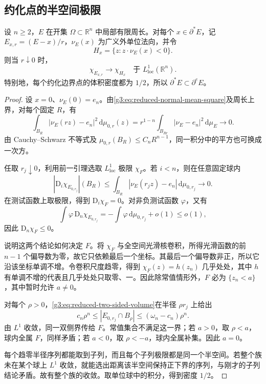 \subsection{约化点的半空间极限}
\label{g3:subsec:2104:03}
\begin{theorem}\label{g3:thm:reduced-boundary-blowup}
	设 \(n\ge2\)，\(E\) 在开集 \(\Omega\subset\mathbb R^n\) 中局部有限周长。对每个 \(x\in\partial^*E\)，记 \(E_{x,r}=(E-x)/r\)，\(\nu_E(x)\) 为广义外单位法向，并令
	\[
		H_x=\{z:z\cdot\nu_E(x)<0\}.
	\]
	则当 \(r\downarrow0\) 时，
	\begin{equation}\label{g3:eq:reduced-halfspace-blowup}
		\chi_{E_{x,r}}\longrightarrow\chi_{H_x}
		\quad\text{于 }L^1_{\mathrm{loc}}(\mathbb R^n).
	\end{equation}
	特别地，每个约化边界点的体积密度都为 \(1/2\)，所以 \(\partial^*E\subset\partial^eE\)。
\end{theorem}
\begin{proof}
	设 \(x=0\)、\(\nu_E(0)=e_n\)。由\eqref{g3:eq:reduced-normal-mean-square}及周长上界，对每个固定 \(R\)，有
	\begin{equation}\label{g3:eq:blowup-normal-error}
		\int_{B_R}|\nu_E(rz)-e_n|^2\,\mathrm d\mu_{0,r}(z)
		=r^{1-n}\int_{B_{Rr}}|\nu_E-e_n|^2\,\mathrm d\mu_E
		\longrightarrow0.
	\end{equation}
	由 Cauchy--Schwarz 不等式及 \(\mu_{0,r}(B_R)\le C_nR^{n-1}\)，同一积分中的平方也可换成一次方。

	任取 \(r_j\downarrow0\)，利用前一引理选取 \(L^1_{\mathrm{loc}}\) 极限 \(\chi_F\)。若 \(i<n\)，则在任意固定球内
	\[
		|\mathrm D_i\chi_{E_{0,r_j}}|(B_R)
		\le\int_{B_R}|\nu_E(r_jz)-e_n|\,\mathrm d\mu_{0,r_j}\longrightarrow0.
	\]
	在测试函数上取极限，得到 \(\mathrm D_i\chi_F=0\)。对非负测试函数 \(\varphi\)，又有
	\[
		\int\varphi\,\mathrm D_n\chi_{E_{0,r_j}}
		=-\int\varphi\,\mathrm d\mu_{0,r_j}+o(1)\le o(1),
	\]
	因此 \(\mathrm D_n\chi_F\le0\)。

	说明这两个结论如何决定 \(F\)。将 \(\chi_F\) 与全空间光滑核卷积，所得光滑函数的前 \(n-1\) 个偏导数为零，故它只依赖最后一个坐标。其最后一个偏导数非正，所以它沿该坐标单调不增。令卷积尺度趋零，得到
	\(\chi_F(z)=h(z_n)\) 几乎处处，其中 \(h\) 有单调不增的代表且几乎处处只取零、一。因此除常值情形外，\(F\) 必为
	\(\{z_n<a\}\)，其中暂时允许 \(a\ne0\)。

	对每个 \(\rho>0\)，\eqref{g3:eq:reduced-two-sided-volume}在半径 \(\rho r_j\) 上给出
	\[
		c_n\rho^n\le |E_{0,r_j}\cap B_\rho|
		\le(\omega_n-c_n)\rho^n.
	\]
	由 \(L^1\) 收敛，同一双侧界传给 \(F\)。常值集合不满足这一界；若 \(a>0\)，取 \(\rho<a\)，球内全属 \(F\)，同样矛盾；若 \(a<0\)，取 \(\rho<-a\)，球内全属补集。因此 \(a=0\)。

	每个趋零半径序列都能取到子列，而且每个子列极限都是同一个半空间。若整个族未在某个球上 \(L^1\) 收敛，就能选出距离该半空间保持正下界的序列，与刚才的子列结论矛盾。故有整个族的收敛。取单位球中的积分，得到密度 \(1/2\)。
\end{proof}

